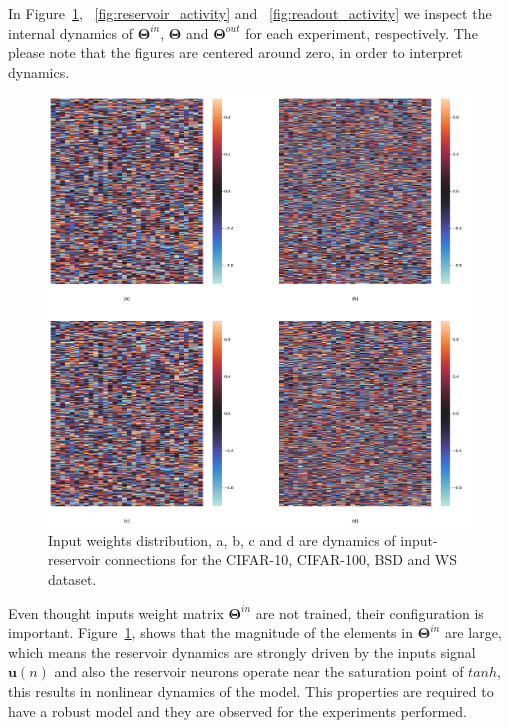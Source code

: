 \documentclass{WitsPhysicsReport}
\begin{document}
In Figure~\ref{fig:input_activity}, ~\ref{fig:reservoir_activity} and ~\ref{fig:readout_activity} we inspect the internal dynamics of ${\mathbf{\Theta}}^{in}$, ${\mathbf{\Theta}}$ and ${\mathbf{\Theta}}^{out}$ for each  experiment, respectively.  The please note that the figures are centered around zero,  in order to interpret dynamics.



\begin{figure}[H]
\centering
  \includegraphics[width=1\textwidth]{Figure/Results/Reservoir_activity_Input_weights_activity_.png}
 \caption{Input weights distribution, a, b, c and d are dynamics of input-reservoir connections for the CIFAR-10, CIFAR-100, BSD and WS dataset.}
 \label{fig:input_activity}
\end{figure}

Even thought inputs weight matrix ${\mathbf{\Theta}}^{in}$ are not trained, their configuration is important. Figure~\ref{fig:input_activity}, shows that the magnitude of the elements in ${\mathbf{\Theta}}^{in}$ are large, which means the reservoir dynamics are strongly driven by the inputs signal $\mathbf{u}(n)$ and also the reservoir neurons operate near the saturation point of $tanh$, this results in nonlinear dynamics of the model. This properties are required to have a robust model and they are observed for the experiments performed.
\end{document}
